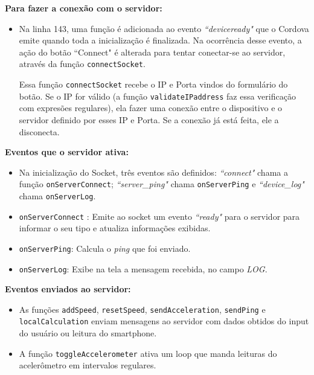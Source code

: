 \documentclass[a4paper,12pt]{article}
\newcommand{\code}[1]{\lstinline[mathescape=true, columns=fixed, basicstyle={\small\ttfamily}]{#1}}
\begin{document}
\textbf{Para fazer a conexão com o servidor:}

\begin{itemize}
  \item Na linha 143, uma função é adicionada ao evento \emph{“deviceready"} que o Cordova emite quando toda a inicialização é finalizada. Na ocorrência desse evento, a ação do botão “Connect" é alterada para tentar conectar-se ao servidor, através da função \code{connectSocket}.

Essa função \code{connectSocket} recebe o IP e Porta vindos do formulário do botão. Se o IP for válido (a função \code{validateIPaddress} faz essa verificação com expresões regulares), ela fazer uma conexão entre o dispositivo e o servidor definido por esses IP e Porta. Se a conexão já está feita, ele a disconecta.
\end{itemize}

\textbf{Eventos que o servidor ativa:}
\begin{itemize}
  \item Na inicialização do Socket, três eventos são definidos: \emph{“connect"} chama a função \code{onServerConnect}; \emph{“server\_ping"} chama \code{onServerPing} e  \emph{“device\_log"} chama \code{onServerLog}.

  \item \code{onServerConnect} : Emite ao socket um evento \emph{“ready"} para o servidor para informar o seu tipo e atualiza informações exibidas.

  \item \code{onServerPing}: Calcula o \emph{ping} que foi enviado.

  \item \code{onServerLog}: Exibe na tela a mensagem recebida, no campo \emph{LOG}.
\end{itemize}


\textbf{Eventos enviados ao servidor:}
\begin{itemize}
  \item As funções \code{addSpeed}, \code{resetSpeed}, \code{sendAcceleration}, \code{sendPing} e \code{localCalculation} enviam mensagens ao servidor com dados obtidos do input do usuário ou leitura do smartphone.

  \item A função \code{toggleAccelerometer} ativa um loop que manda leituras do acelerômetro em intervalos regulares.
\end{itemize}



\end{document}
